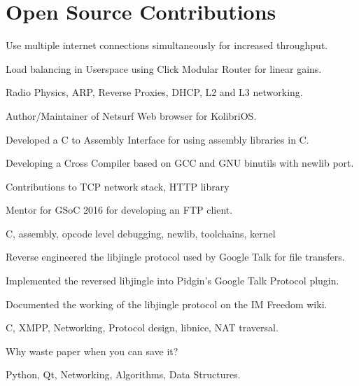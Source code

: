 \documentclass[letterpaper]{deedy-resume} %
\begin{document}
\begin{minipage}[t]{0.66\textwidth}
\section{Open Source Contributions}
\begin{tightitemize}
\item Use multiple internet connections simultaneously for increased throughput.
\item Load balancing in Userspace using Click Modular Router for linear gains.
\item Radio Physics, ARP, Reverse Proxies, DHCP, L2 and L3 networking.
\end{tightitemize}
\sectionspace %
\begin{tightitemize}
\item Author/Maintainer of Netsurf Web browser for KolibriOS.
\item Developed a C to Assembly Interface for using assembly libraries in C.
\item Developing a Cross Compiler based on GCC and GNU binutils with newlib port.
\item Contributions to TCP network stack, HTTP library
\item Mentor for GSoC 2016 for developing an FTP client.
\item C, assembly, opcode level debugging, newlib, toolchains, kernel
\end{tightitemize}
\sectionspace %
\begin{tightitemize}
\item Reverse engineered the libjingle protocol used by Google Talk for file transfers.
\item Implemented the reversed libjingle into Pidgin's Google Talk Protocol plugin.
\item Documented the working of the libjingle protocol on the IM Freedom wiki.
\item C, XMPP, Networking, Protocol design, libnice, NAT traversal.
\end{tightitemize}
\sectionspace %
\begin{tightitemize}
\item Why waste paper when you can save it?
\item Python, Qt, Networking, Algorithms, Data Structures.
\end{tightitemize}
\sectionspace %

\end{minipage}
\end{document}
